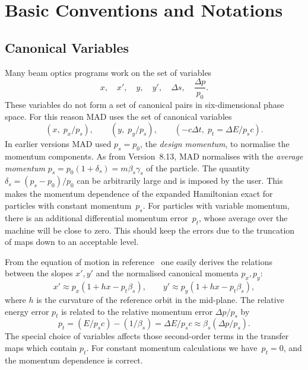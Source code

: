 
 
\chapter{Basic Conventions and Notations}
\label{notation}
 
 
\section{Canonical Variables}
Many beam optics programs work on the set of variables
\begin{equation}
x,\quad x',\quad y,\quad y',\quad \Delta s,\quad \frac{\Delta p}{p_0}.
\end{equation}
These variables do not form a set of canonical pairs in
six-dimensional phase space. 
For this reason MAD uses the set of canonical variables
\begin{equation}
( x, \; p_x/p_s), \qquad ( y, \; p_y/p_s), \qquad
( - c \Delta t, \; p_t = \Delta E/p_s c).
\end{equation}
In earlier versions MAD used $p_s = p_0$, the {\em design momentum},
to normalise the momentum components.
As from Version~8.13, MAD normalises with the {\em average momentum}
$p_s = p_0 ( 1 + \delta_s) = m \beta_s \gamma_s$ of the particle.
The quantity $\delta_s = (p_s - p_0) / p_0$ can be arbitrarily large
and is imposed by the user.
This makes the momentum dependence of the expanded Hamiltonian exact
for particles with constant momentum~$p_s$.
For particles with variable momentum,
there is an additional differential momentum error~$p_t$,
whose average over the machine will be close to zero.
This should keep the errors due to the truncation of maps down to an
acceptable level.
 
From the equation of motion in reference~\cite{ISE85} one easily
derives the relations between the slopes $x', y'$ and the normalised
canonical momenta $p_x, p_y$:
\begin{equation}
x' \approx p_x (1 + h x - p_t\beta_s), \qquad
y' \approx p_y (1 + h x - p_t\beta_s),
\end{equation}
where $h$ is the curvature of the reference orbit in the mid-plane.
The relative energy error $p_t$ is related to the relative momentum
error $\Delta p / p_s$ by
\begin{equation}
p_t = (E/p_s c) - (1/\beta_s) = \Delta E/p_s c
  \approx \beta_s (\Delta p/p_s).
\end{equation}
The special choice of variables affects those second-order terms
in the transfer maps which contain $p_t$.
For constant momentum calculations we have~$p_t = 0$,
and the momentum dependence is correct.
 
